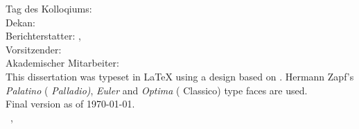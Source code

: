 \thispagestyle{empty}

\hfill
\vfill

{\raggedright
\noindent
Tag des Kolloqiums:  \\
Dekan:   \\  
Berichterstatter:  \myProf, \myOtherProf \\
Vorsitzender:  \\
Akademischer Mitarbeiter: \\
\bigskip
\noindent
This dissertation was typeset in \LaTeX{}  using a design based on \texttt{\classicthesis}.
Hermann Zapf's \emph{Palatino} (\emph{ Palladio)}, \emph{Euler} and \emph{Optima} ( Classico) type faces are used.\\
\bigskip
\noindent
{Final version} as of \today.\\
\bigskip
\noindent
\textcopyright\ \myName, \myTime
}
